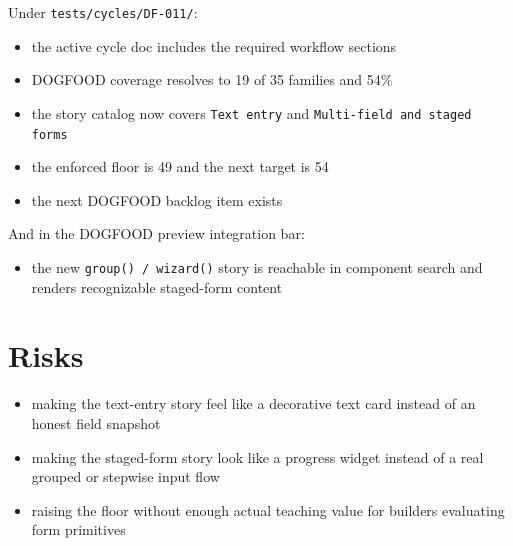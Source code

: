 Under \texttt{t\allowbreak{}e\allowbreak{}s\allowbreak{}t\allowbreak{}s\allowbreak{}/\allowbreak{}c\allowbreak{}y\allowbreak{}c\allowbreak{}l\allowbreak{}e\allowbreak{}s\allowbreak{}/\allowbreak{}D\allowbreak{}F\allowbreak{}-\allowbreak{}0\allowbreak{}1\allowbreak{}1\allowbreak{}/}:

\begin{itemize}
\tightlist
\item
  the active cycle doc includes the required workflow sections
\item
  DOGFOOD coverage resolves to 19 of 35 families and 54\%
\item
  the story catalog now covers \texttt{T\allowbreak{}e\allowbreak{}x\allowbreak{}t\allowbreak{} \allowbreak{}e\allowbreak{}n\allowbreak{}t\allowbreak{}r\allowbreak{}y} and \texttt{M\allowbreak{}u\allowbreak{}l\allowbreak{}t\allowbreak{}i\allowbreak{}-\allowbreak{}f\allowbreak{}i\allowbreak{}e\allowbreak{}l\allowbreak{}d\allowbreak{} \allowbreak{}a\allowbreak{}n\allowbreak{}d\allowbreak{} \allowbreak{}s\allowbreak{}t\allowbreak{}a\allowbreak{}g\allowbreak{}e\allowbreak{}d\allowbreak{} \allowbreak{}f\allowbreak{}o\allowbreak{}r\allowbreak{}m\allowbreak{}s}
\item
  the enforced floor is 49 and the next target is 54
\item
  the next DOGFOOD backlog item exists
\end{itemize}

And in the DOGFOOD preview integration bar:

\begin{itemize}
\tightlist
\item
  the new \texttt{g\allowbreak{}r\allowbreak{}o\allowbreak{}u\allowbreak{}p\allowbreak{}(\allowbreak{})\allowbreak{} \allowbreak{}/\allowbreak{} \allowbreak{}w\allowbreak{}i\allowbreak{}z\allowbreak{}a\allowbreak{}r\allowbreak{}d\allowbreak{}(\allowbreak{})} story is reachable in component search and renders recognizable staged-form content
\end{itemize}

\section{Risks}\label{record-073-risks}

\begin{itemize}
\tightlist
\item
  making the text-entry story feel like a decorative text card instead of an honest field snapshot
\item
  making the staged-form story look like a progress widget instead of a real grouped or stepwise input flow
\item
  raising the floor without enough actual teaching value for builders evaluating form primitives
\end{itemize}

